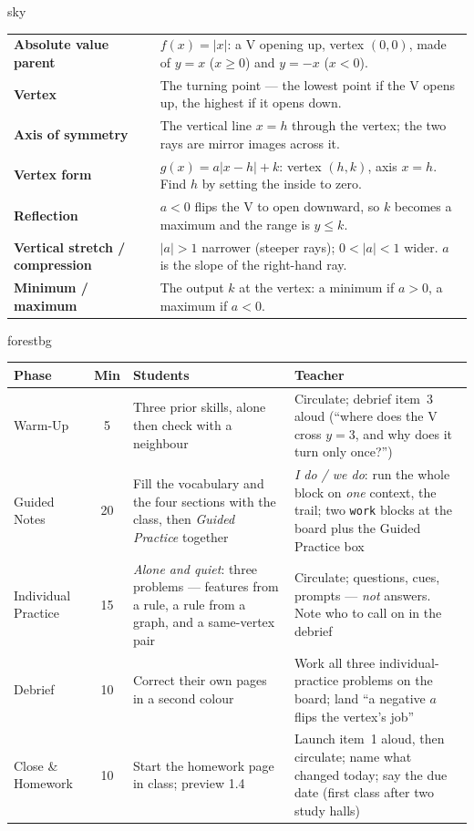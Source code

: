 \documentclass[10pt]{article}
\newcommand{\MeetingLength}{60 minutes}
\begin{document}
\begin{skillbox}{sky}
\renewcommand{\arraystretch}{1.3}
\begin{tabularx}{\linewidth}{@{}l X@{}}
\textbf{Absolute value parent} & $f(x)=|x|$: a V opening up, vertex $(0,0)$, made of $y=x$ ($x\ge0$) and $y=-x$ ($x<0$). \\
\textbf{Vertex} & The turning point --- the lowest point if the V opens up, the highest if it opens down. \\
\textbf{Axis of symmetry} & The vertical line $x=h$ through the vertex; the two rays are mirror images across it. \\
\textbf{Vertex form} & $g(x)=a|x-h|+k$: vertex $(h,k)$, axis $x=h$. Find $h$ by setting the inside to zero. \\
\textbf{Reflection} & $a<0$ flips the V to open downward, so $k$ becomes a maximum and the range is $y\le k$. \\
\textbf{Vertical stretch / compression} & $|a|>1$ narrower (steeper rays); $0<|a|<1$ wider. $a$ is the slope of the right-hand ray. \\
\textbf{Minimum / maximum} & The output $k$ at the vertex: a minimum if $a>0$, a maximum if $a<0$. \\
\end{tabularx}
\end{skillbox}

\begin{fixedskillbox}[Lesson at a Glance --- \MeetingLength]{forestbg}
\renewcommand{\arraystretch}{1.25}
\begin{tabularx}{\linewidth}{@{}l c X X@{}}
\textbf{Phase} & \textbf{Min} & \textbf{Students} & \textbf{Teacher} \\
\hline
Warm-Up & 5 & Three prior skills, alone then check with a neighbour & Circulate; debrief item~3 aloud (``where does the V cross $y=3$, and why does it turn only once?'') \\
Guided Notes & 20 & Fill the vocabulary and the four sections with the class, then \emph{Guided Practice} together & \emph{I do / we do}: run the whole block on \emph{one} context, the trail; two \texttt{work} blocks at the board plus the Guided Practice box \\
Individual Practice & 15 & \emph{Alone and quiet}: three problems --- features from a rule, a rule from a graph, and a same-vertex pair & Circulate; questions, cues, prompts --- \emph{not} answers. Note who to call on in the debrief \\
Debrief & 10 & Correct their own pages in a second colour & Work all three individual-practice problems on the board; land ``a negative $a$ flips the vertex's job'' \\
Close \& Homework & 10 & Start the homework page in class; preview 1.4 & Launch item~1 aloud, then circulate; name what changed today; say the due date (first class after two study halls) \\
\end{tabularx}
\end{fixedskillbox}
\end{document}
